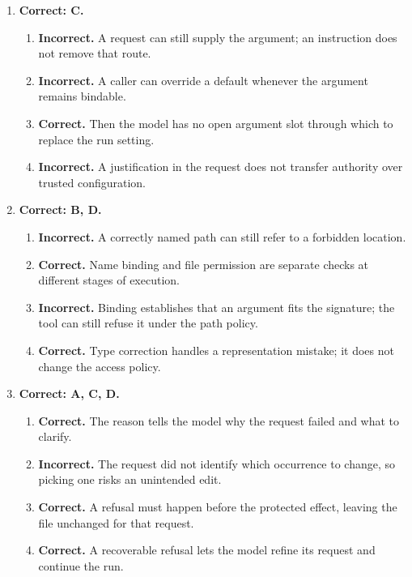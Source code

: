 \begin{enumerate}[start=31,itemsep=0.7\baselineskip]
\item[{\hyperref[exercise:34]{34.}}] \begin{minipage}[t]{\linewidth}
\textbf{Correct: C.}
\begin{enumerate}[label=\textnormal{(\Alph*)},leftmargin=*,itemsep=0pt]
\item \textbf{Incorrect.} A request can still supply the argument; an instruction does not remove that route.
\item \textbf{Incorrect.} A caller can override a default whenever the argument remains bindable.
\item \textbf{Correct.} Then the model has no open argument slot through which to replace the run setting.
\item \textbf{Incorrect.} A justification in the request does not transfer authority over trusted configuration.
\end{enumerate}
\end{minipage}

\item[{\hyperref[exercise:35]{35.}}] \begin{minipage}[t]{\linewidth}
\textbf{Correct: B, D.}
\begin{enumerate}[label=\textnormal{(\Alph*)},leftmargin=*,itemsep=0pt]
\item \textbf{Incorrect.} A correctly named path can still refer to a forbidden location.
\item \textbf{Correct.} Name binding and file permission are separate checks at different stages of execution.
\item \textbf{Incorrect.} Binding establishes that an argument fits the signature; the tool can still refuse it under the path policy.
\item \textbf{Correct.} Type correction handles a representation mistake; it does not change the access policy.
\end{enumerate}
\end{minipage}

\item[{\hyperref[exercise:36]{36.}}] \begin{minipage}[t]{\linewidth}
\textbf{Correct: A, C, D.}
\begin{enumerate}[label=\textnormal{(\Alph*)},leftmargin=*,itemsep=0pt]
\item \textbf{Correct.} The reason tells the model why the request failed and what to clarify.
\item \textbf{Incorrect.} The request did not identify which occurrence to change, so picking one risks an unintended edit.
\item \textbf{Correct.} A refusal must happen before the protected effect, leaving the file unchanged for that request.
\item \textbf{Correct.} A recoverable refusal lets the model refine its request and continue the run.
\end{enumerate}
\end{minipage}


\end{enumerate}
